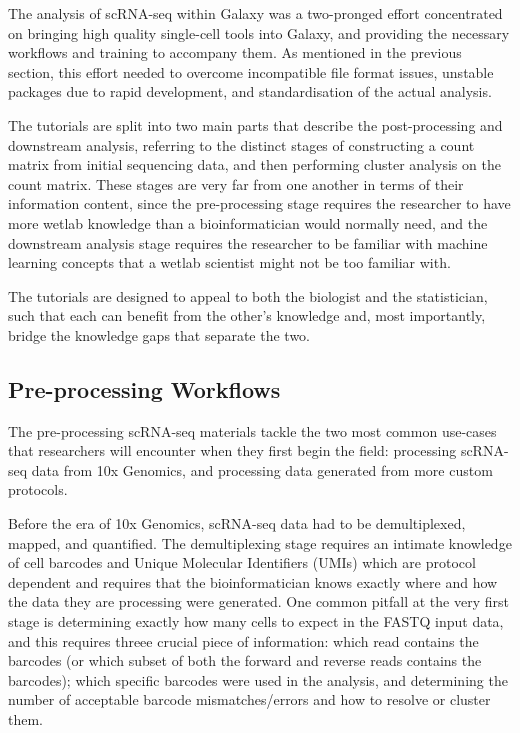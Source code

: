 \documentclass[a4paper,num-refs]{oup-contemporary}
\begin{document}
The analysis of scRNA-seq within Galaxy was a two-pronged effort concentrated on bringing high quality single-cell tools into Galaxy, and providing the necessary workflows and training to accompany them. As mentioned in the previous section, this effort needed to overcome incompatible file format issues, unstable packages due to rapid development, and standardisation of the actual analysis.


The tutorials are split into two main parts that describe the post-processing and downstream analysis, referring to the distinct stages of constructing a count matrix from initial sequencing data, and then performing cluster analysis on the count matrix. These stages are very far from one another in terms of their information content, since the pre-processing stage requires the researcher to have more wetlab knowledge than a bioinformatician would normally need, and the downstream analysis stage requires the researcher to be familiar with machine learning concepts that a wetlab scientist might not be too familiar with.

The tutorials are designed to appeal to both the biologist and the statistician, such that each can benefit from the other's knowledge and, most importantly, bridge the knowledge gaps that separate the two.

\subsection{Pre-processing Workflows}

The pre-processing scRNA-seq materials tackle the two most common use-cases that researchers will encounter when they first begin the field: processing scRNA-seq data from 10x Genomics, and processing data generated from more custom protocols.

Before the era of 10x Genomics, scRNA-seq data had to be demultiplexed, mapped, and quantified. The demultiplexing stage requires an intimate knowledge of cell barcodes and Unique Molecular Identifiers (UMIs) which are protocol dependent and requires that the bioinformatician knows exactly where and how the data they are processing were generated. One common pitfall at the very first stage is determining exactly how many cells to expect in the FASTQ input data, and this requires threee crucial piece of information: which read contains the barcodes (or which subset of both the forward and reverse reads contains the barcodes); which specific barcodes were used in the analysis, and determining the number of acceptable barcode mismatches/errors and how to resolve or cluster them.
\end{document}
